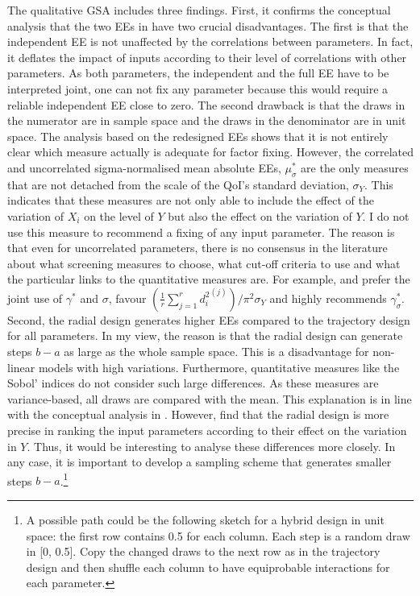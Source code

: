 \noindent
The qualitative GSA includes three findings.
First, it confirms the conceptual analysis that the two EEs in \cite{ge2017extending} have two crucial disadvantages. The first is that the independent EE is not unaffected by the correlations between parameters. In fact, it deflates the impact of inputs according to their level of correlations with other parameters. As both parameters, the independent and the full EE have to be interpreted joint, one can not fix any parameter because this would require a reliable independent EE close to zero. The second drawback is that the draws in the numerator are in sample space and the draws in the denominator are in unit space. The analysis based on the redesigned EEs shows that it is not entirely clear which measure actually is adequate for factor fixing. However, the correlated and uncorrelated sigma-normalised mean absolute EEs, $\mu_\sigma^*$ are the only measures that are not detached from the scale of the QoI's standard deviation, $\sigma_Y$. This indicates that these measures are not only able to include the effect of the variation of $X_i$ on the level of $Y$ but also the effect on the variation of $Y$. I do not use this measure to recommend a fixing of any input parameter. The reason is that even for uncorrelated parameters, there is no consensus in the literature about what screening measures to choose, what cut-off criteria to use and what the particular links to the quantitative measures are. For example, \cite{campolongo2007effective} and \cite{ge2017extending} prefer the joint use of $\gamma^*$ and $\sigma$, \cite{kucherenko2009derivative} favour $(\frac{1}{r} \sum_{j=1}^{r} {d_i^2}^{(j)})/\pi^2 \sigma_Y$ and \cite{Smith.2014} highly recommends $\gamma^*_{\sigma}$.\\

\noindent
Second, the radial design generates higher EEs compared to the trajectory design for all parameters. In my view, the reason is that the radial design can generate steps $b-a$ as large as the whole sample space. This is a disadvantage for non-linear models with high variations. Furthermore, quantitative measures like the Sobol' indices do not consider such large differences. As these measures are variance-based, all draws are compared with the mean. This explanation is in line with the conceptual analysis in \cite{kucherenko2009derivative}. However, \cite{campolongo2007effective} find that the radial design is more precise in ranking the input parameters according to their effect on the variation in $Y$. Thus, it would be interesting to analyse these differences more closely. In any case, it is important to develop a sampling scheme that generates smaller steps $b-a$.\footnote{A possible path could be the following sketch for a hybrid design in unit space: the first row contains 0.5 for each column. Each step is a random draw in [0, 0.5]. Copy the changed draws to the next row as in the trajectory design and then shuffle each column to have equiprobable interactions for each parameter.}\\

